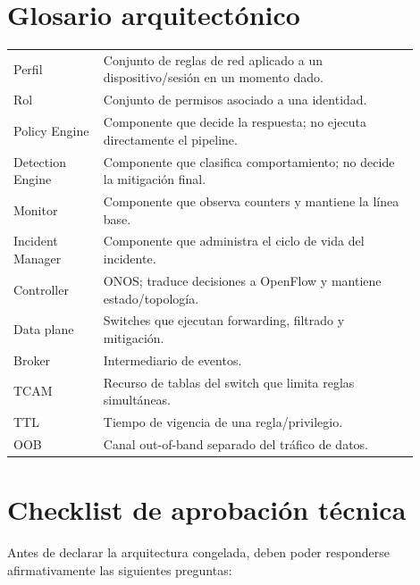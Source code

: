 \documentclass[11pt,a4paper]{article}
\begin{document}
\section{Glosario arquitectónico}

\begin{longtable}{p{0.2\linewidth}p{0.7\linewidth}}
\toprule
Perfil & Conjunto de reglas de red aplicado a un dispositivo/sesión en un momento dado.\\
Rol & Conjunto de permisos asociado a una identidad.\\
Policy Engine & Componente que decide la respuesta; no ejecuta directamente el pipeline.\\
Detection Engine & Componente que clasifica comportamiento; no decide la mitigación final.\\
Monitor & Componente que observa counters y mantiene la línea base.\\
Incident Manager & Componente que administra el ciclo de vida del incidente.\\
Controller & ONOS; traduce decisiones a OpenFlow y mantiene estado/topología.\\
Data plane & Switches que ejecutan forwarding, filtrado y mitigación.\\
Broker & Intermediario de eventos.\\
TCAM & Recurso de tablas del switch que limita reglas simultáneas.\\
TTL & Tiempo de vigencia de una regla/privilegio.\\
OOB & Canal out-of-band separado del tráfico de datos.\\
\bottomrule
\end{longtable}

\section{Checklist de aprobación técnica}

Antes de declarar la arquitectura congelada, deben poder responderse afirmativamente las siguientes preguntas:
\end{document}
